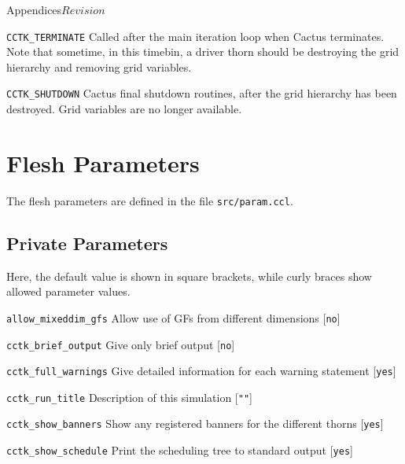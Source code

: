 \begin{cactuspart}{Appendices}{}{$Revision$}
\begin{Lentry}
\item[{\tt CCTK\_TERMINATE}]
        Called after the main iteration loop when Cactus terminates. 
        Note that sometime, in this timebin, a driver thorn should be 
        destroying the grid hierarchy and removing grid variables. 

\item[{\tt CCTK\_SHUTDOWN}]
        Cactus final shutdown routines, after the grid hierarchy has been 
        destroyed. Grid variables are no longer available.

\end{Lentry}


\chapter{Flesh Parameters}

The flesh parameters are defined in the file {\tt src/param.ccl}.

\section{Private Parameters}

Here, the default value is shown in square brackets, while curly braces show allowed parameter values.

\begin{Lentry}

\item[{\tt allow\_mixeddim\_gfs}]
Allow use of GFs from different dimensions [{\tt no}]

\item [{\tt cctk\_brief\_output}]
Give only brief output [{\tt no}]

\item[{\tt cctk\_full\_warnings}]
Give detailed information for each warning statement [{\tt yes}]

\item [{\tt cctk\_run\_title}]
Description of this simulation [{\tt ""}]

\item [{\tt cctk\_show\_banners}]
Show any registered banners for the different thorns [{\tt yes}]

\item [{\tt cctk\_show\_schedule}]
Print the scheduling tree to standard output [{\tt yes}]


\end{Lentry}
\end{cactuspart}
